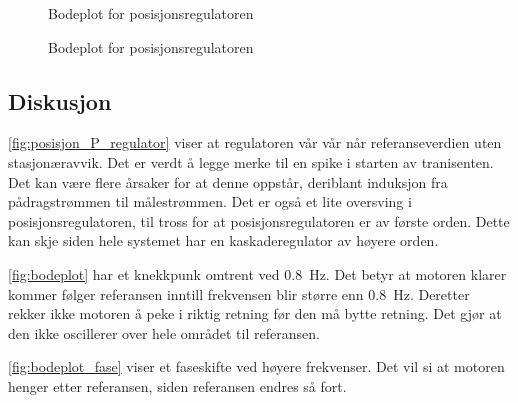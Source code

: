 \begin{figure}[h]
    \centering
    
    \caption{Bodeplot for posisjonsregulatoren}
    \label{fig:bodeplot}
\end{figure}

\begin{figure}[h]
    \centering
    
    \caption{Bodeplot for posisjonsregulatoren}
    \label{fig:bodeplot_fase}
\end{figure}







\subsection{Diskusjon}

\autoref{fig:posisjon_P_regulator} viser at regulatoren vår vår når referanseverdien uten stasjonæravvik. Det er verdt å legge merke til en spike i starten av tranisenten. Det kan være flere årsaker for at denne oppstår, deriblant induksjon fra pådragstrømmen til målestrømmen. Det er også et lite oversving i posisjonsregulatoren, til tross for at posisjonsregulatoren er av første orden. Dette kan skje siden hele systemet har en kaskaderegulator av høyere orden.

\autoref{fig:bodeplot} har et knekkpunk omtrent ved \SI{0.8}{\hertz}. Det betyr at motoren klarer kommer følger referansen inntill frekvensen blir større enn \SI{0.8}{\hertz}. Deretter rekker ikke motoren å peke i riktig retning før den må bytte retning. Det gjør at den ikke oscillerer over hele området til referansen.

\autoref{fig:bodeplot_fase} viser et faseskifte ved høyere frekvenser. Det vil si at motoren henger etter referansen, siden referansen endres så fort.





































